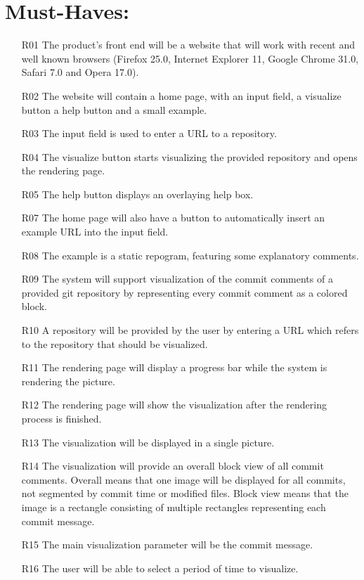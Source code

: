\documentclass[12pt]{scrartcl}
\begin{document}
\section{Must-Haves:}
\begin{enumerate}
\item [R01] The product's front end will be a website that will work with recent and well known browsers (Firefox 25.0, Internet Explorer 11, Google Chrome 31.0, Safari 7.0 and Opera 17.0).
\item [R02] The website will contain a home page, with an input field, a visualize button a help button and a small example.
\item [R03] The input field is used to enter a URL to a repository.
\item [R04] The visualize button starts visualizing the provided repository and opens the rendering page.
\item [R05] The help button displays an overlaying help box.
\item [R07] The home page will also have a button to automatically insert an example URL into the input field.
\item [R08] The example is a static repogram, featuring some explanatory comments.
\item [R09] The system will support visualization of the commit comments of a provided git repository by representing every commit comment as a colored block.
\item [R10] A repository will be provided by the user by entering a URL which refers to the repository that should be visualized.
\item [R11] The rendering page will display a progress bar while the system is rendering the picture.
\item [R12] The rendering page will show the visualization after the rendering process is finished.
\item [R13] The visualization will be displayed in a single picture.
\item [R14] The visualization will provide an overall block view of all commit
	comments. Overall means that one image will be displayed for all
	commits, not segmented by commit time or modified files. Block view means
	that the image is a rectangle consisting of multiple rectangles
	representing each commit message.
\item [R15] The main visualization parameter will be the commit message.
\item [R16] The user will be able to select a period of time to visualize. 

\end{enumerate}
\end{document}
